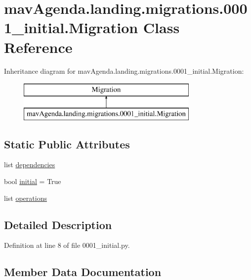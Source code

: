 \hypertarget{classmavAgenda_1_1landing_1_1migrations_1_10001__initial_1_1Migration}{}\section{mav\+Agenda.\+landing.\+migrations.0001\+\_\+initial.Migration Class Reference}
\label{classmavAgenda_1_1landing_1_1migrations_1_10001__initial_1_1Migration}
Inheritance diagram for mav\+Agenda.\+landing.\+migrations.0001\+\_\+initial.Migration\+:\begin{figure}[H]
\begin{center}
\leavevmode
\includegraphics[height=2.000000cm]{classmavAgenda_1_1landing_1_1migrations_1_10001__initial_1_1Migration}
\end{center}
\end{figure}
\subsection*{Static Public Attributes}
\begin{DoxyCompactItemize}
\item 
list \mbox{\hyperlink{classmavAgenda_1_1landing_1_1migrations_1_10001__initial_1_1Migration_a4a4b4f33eda8c2082eb659c1de67ec96}{dependencies}}
\item 
bool \mbox{\hyperlink{classmavAgenda_1_1landing_1_1migrations_1_10001__initial_1_1Migration_ab7532a2b45110859158e4e0b62006e3b}{initial}} = True
\item 
list \mbox{\hyperlink{classmavAgenda_1_1landing_1_1migrations_1_10001__initial_1_1Migration_a9aee007040722d543adaeb5651d6fc00}{operations}}
\end{DoxyCompactItemize}


\subsection{Detailed Description}


Definition at line 8 of file 0001\+\_\+initial.\+py.



\subsection{Member Data Documentation}
\mbox{\label{classmavAgenda_1_1landing_1_1migrations_1_10001__initial_1_1Migration_a4a4b4f33eda8c2082eb659c1de67ec96}} 
